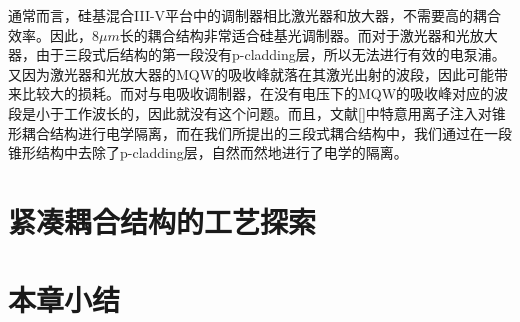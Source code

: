通常而言，硅基混合III-V平台中的调制器相比激光器和放大器，不需要高的耦合效率。因此，$8 \mu m$长的耦合结构非常适合硅基光调制器。而对于激光器和光放大器，由于三段式后结构的第一段没有p-cladding层，所以无法进行有效的电泵浦。又因为激光器和光放大器的MQW的吸收峰就落在其激光出射的波段，因此可能带来比较大的损耗。而对与电吸收调制器，在没有电压下的MQW的吸收峰对应的波段是小于工作波长的，因此就没有这个问题。而且，文献[]中特意用离子注入对锥形耦合结构进行电学隔离，而在我们所提出的三段式耦合结构中，我们通过在一段锥形结构中去除了p-cladding层，自然而然地进行了电学的隔离。
\section{紧凑耦合结构的工艺探索}
\section{本章小结}
